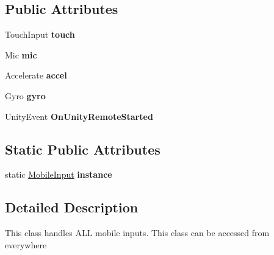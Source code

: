 \subsection*{Public Attributes}
\begin{DoxyCompactItemize}
\item 
\mbox{\label{class_mobile_sensors_1_1_mobile_input_ababe459fb35f3fbefa78a6cbe77aacb0}} 
Touch\+Input {\bfseries touch}
\item 
\mbox{\label{class_mobile_sensors_1_1_mobile_input_ad2f6ad5bca1a294c41b2404300e83d04}} 
Mic {\bfseries mic}
\item 
\mbox{\label{class_mobile_sensors_1_1_mobile_input_a2e73a5efc826fecac5fd3b7e518d0876}} 
Accelerate {\bfseries accel}
\item 
\mbox{\label{class_mobile_sensors_1_1_mobile_input_a3b60d423749d52469e54b5cd6b9cc16c}} 
Gyro {\bfseries gyro}
\item 
\mbox{\label{class_mobile_sensors_1_1_mobile_input_a7a33d7de90cede62e15e0b0805590139}} 
Unity\+Event {\bfseries On\+Unity\+Remote\+Started}
\end{DoxyCompactItemize}
\subsection*{Static Public Attributes}
\begin{DoxyCompactItemize}
\item 
\mbox{\label{class_mobile_sensors_1_1_mobile_input_a737133a7da47c769ae1b33cc650acb69}} 
static \mbox{\hyperlink{class_mobile_sensors_1_1_mobile_input}{Mobile\+Input}} {\bfseries instance}
\end{DoxyCompactItemize}


\subsection{Detailed Description}
This class handles A\+LL mobile inputs. This class can be accessed from everywhere 



